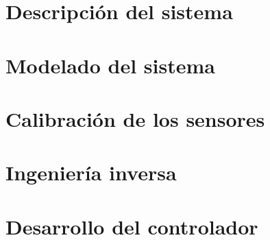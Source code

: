 \documentclass[spanish,12pt,a4paper,titlepage]{report}
\begin{document}

\part{Descripción del sistema}

\part{Modelado del sistema}


\part{Calibración de los sensores}





\part{Ingeniería inversa}


\part{Desarrollo del controlador}



\cleardoublepage
\addappheadtotoc
\appendixpage
\renewcommand{\appendixname}{Anexo}
\renewcommand{\appendixtocname}{Anexo}
\renewcommand{\appendixpagename}{Anexos}

\appendix %
 

 

\end{document}
